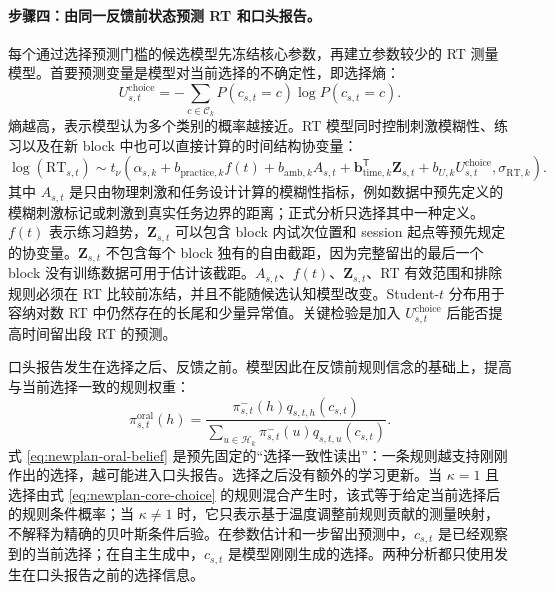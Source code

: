 \paragraph{步骤四：由同一反馈前状态预测 RT 和口头报告。}
每个通过选择预测门槛的候选模型先冻结核心参数，再建立参数较少的 RT 测量模型。首要预测变量是模型对当前选择的不确定性，即选择熵：
\begin{equation}
    U^{\mathrm{choice}}_{s,t}
    =-\sum_{c\in\mathcal C_k}P(c_{s,t}=c)\log P(c_{s,t}=c).
    \label{eq:newplan-choice-entropy}
\end{equation}
熵越高，表示模型认为多个类别的概率越接近。RT 模型同时控制刺激模糊性、练习以及在新 block 中也可以直接计算的时间结构协变量：
\begin{equation}
    \log(\mathrm{RT}_{s,t})
    \sim t_\nu\!\left(
      \alpha_{s,k}+b_{\mathrm{practice},k}f(t)
      +b_{\mathrm{amb},k}A_{s,t}
      +\mathbf b_{\mathrm{time},k}^{\mathsf T}\mathbf Z_{s,t}
      +b_{U,k}U^{\mathrm{choice}}_{s,t},
      \sigma_{\mathrm{RT},k}
    \right).
    \label{eq:newplan-rt-channel}
\end{equation}
其中 $A_{s,t}$ 是只由物理刺激和任务设计计算的模糊性指标，例如数据中预先定义的模糊刺激标记或刺激到真实任务边界的距离；正式分析只选择其中一种定义。$f(t)$ 表示练习趋势，$\mathbf Z_{s,t}$ 可以包含 block 内试次位置和 session 起点等预先规定的协变量。$\mathbf Z_{s,t}$ 不包含每个 block 独有的自由截距，因为完整留出的最后一个 block 没有训练数据可用于估计该截距。$A_{s,t}$、$f(t)$、$\mathbf Z_{s,t}$、RT 有效范围和排除规则必须在 RT 比较前冻结，并且不能随候选认知模型改变。Student-$t$ 分布用于容纳对数 RT 中仍然存在的长尾和少量异常值。关键检验是加入 $U^{\mathrm{choice}}_{s,t}$ 后能否提高时间留出段 RT 的预测。

口头报告发生在选择之后、反馈之前。模型因此在反馈前规则信念的基础上，提高与当前选择一致的规则权重：
\begin{equation}
    \pi^{\mathrm{oral}}_{s,t}(h)
    =\frac{\pi^-_{s,t}(h)q_{s,t,h}(c_{s,t})}
    {\sum_{u\in\mathcal H_k}\pi^-_{s,t}(u)q_{s,t,u}(c_{s,t})}.
    \label{eq:newplan-oral-belief}
\end{equation}
式 \ref{eq:newplan-oral-belief} 是预先固定的“选择一致性读出”：一条规则越支持刚刚作出的选择，越可能进入口头报告。选择之后没有额外的学习更新。当 $\kappa=1$ 且选择由式 \ref{eq:newplan-core-choice} 的规则混合产生时，该式等于给定当前选择后的规则条件概率；当 $\kappa\neq1$ 时，它只表示基于温度调整前规则贡献的测量映射，不解释为精确的贝叶斯条件后验。在参数估计和一步留出预测中，$c_{s,t}$ 是已经观察到的当前选择；在自主生成中，$c_{s,t}$ 是模型刚刚生成的选择。两种分析都只使用发生在口头报告之前的选择信息。

